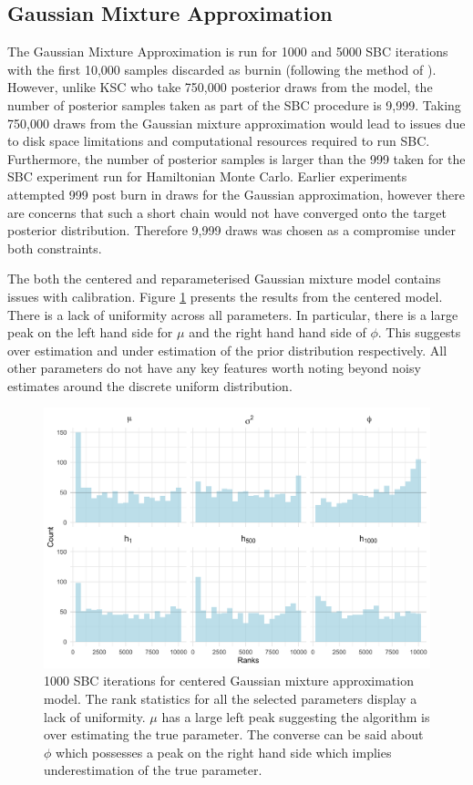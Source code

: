 \documentclass[12pt, a4paper]{article}
\begin{document}
    \subsection{Gaussian Mixture Approximation}
    The Gaussian Mixture Approximation is run for 1000 and 5000 SBC iterations with the first 10,000 samples discarded as burnin (following the method of \citet{kim1998stochastic}). However, unlike KSC who take 750,000 posterior draws from the model, the number of posterior samples taken as part of the SBC procedure is 9,999. Taking 750,000 draws from the Gaussian mixture approximation would lead to issues due to disk space limitations and computational resources required to run SBC. Furthermore, the number of posterior samples is larger than the 999 taken for the SBC experiment run for Hamiltonian Monte Carlo. Earlier experiments attempted 999 post burn in draws for the Gaussian approximation, however there are concerns that such a short chain would not have converged onto the target posterior distribution. Therefore 9,999 draws was chosen as a compromise under both constraints. 

    The both the centered and reparameterised Gaussian mixture model contains issues with calibration. Figure \ref{fig:cpksc1k} presents the results from the centered model. There is a lack of uniformity across all parameters. In particular, there is a large peak on the left hand side for $\mu$ and the right hand hand side of $\phi$. This suggests over estimation and under estimation of the prior distribution respectively. All other parameters do not have any key features worth noting beyond noisy estimates around the discrete uniform distribution. 

    \begin{figure}[H]
        \centering
        \includegraphics[scale=0.1]{results/ksc_cp_1k.png}
        \caption{1000 SBC iterations for centered Gaussian mixture approximation model. The rank statistics for all the selected parameters display a lack of uniformity. $\mu$ has a large left peak suggesting the algorithm is over estimating the true parameter. The converse can be said about $\phi$ which possesses a peak on the right hand side which implies underestimation of the true parameter.}
        \label{fig:cpksc1k}
    \end{figure}
\end{document}
